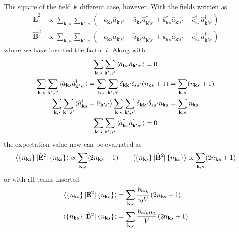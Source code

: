 \documentclass[../../../main.tex]{subfiles}
\begin{document}
The square of the field is different case, however.
With the fields written as
\begin{align*}
  \hat{\mathbf{E}}^2 & \propto \sum_{\mathbf{k},s}\sum_{\mathbf{k}',s'} \left( -\hat{a}_{\mathbf{k }s}\hat{a}_{\mathbf{k }'s'} +\hat{a}_{\mathbf{k }s} \hat{a}^\dagger_{\mathbf{k }'s'} +\hat{a}^\dagger_{\mathbf{k }s} \hat{a}_{\mathbf{k }'s'}  -\hat{a}^\dagger_{\mathbf{k }s} \hat{a}^\dagger_{\mathbf{k }'s'}  \right) \\
  \hat{\mathbf{B}}^2 & \propto \sum_{\mathbf{k},s}\sum_{\mathbf{k}',s'} \left( -\hat{a}_{\mathbf{k }s}\hat{a}_{\mathbf{k }'s'} +\hat{a}_{\mathbf{k }s} \hat{a}^\dagger_{\mathbf{k }'s'} +\hat{a}^\dagger_{\mathbf{k }s} \hat{a}_{\mathbf{k }'s'}  -\hat{a}^\dagger_{\mathbf{k }s} \hat{a}^\dagger_{\mathbf{k }'s'}  \right)
\end{align*}
where we have inserted the factor $i$.
Along with
\begin{gather*}
  \sum_{\mathbf{k},s}\sum_{\mathbf{k}',s'} \braket{\hat{a}_{\mathbf{k }s}   \hat{a}_{\mathbf{k }'s'} }=0                        \\
  \sum_{\mathbf{k},s}\sum_{\mathbf{k}',s'} \braket{\hat{a}_{\mathbf{k }s}   \hat{a}^\dagger_{\mathbf{k }'s'} }=\sum_{\mathbf{k},s}\sum_{\mathbf{k}',s'} \delta_{\mathbf{k}\mathbf{k'}}\delta_{ss'}(n_{\mathbf{k }s}+1)= \sum_{\mathbf{k},s}(n_{\mathbf{k }s}+1) \\
  \sum_{\mathbf{k},s}\sum_{\mathbf{k}',s'} \braket{\hat{a}^\dagger_{\mathbf{k }s}=   \hat{a}_{\mathbf{k }'s'} } \sum_{\mathbf{k},s}\sum_{\mathbf{k}',s'} \delta_{\mathbf{k}\mathbf{k'}}\delta_{ss'}n_{\mathbf{k }s}=\sum_{\mathbf{k},s} n_{\mathbf{k }s} \\
  \sum_{\mathbf{k},s}\sum_{\mathbf{k}',s'} \braket{\hat{a}^\dagger_{\mathbf{k }s}   \hat{a}^\dagger_{\mathbf{k }'s'} }=0
\end{gather*}
the expectation value now can be evaluated as
\begin{equation*}
  \braket{\left\{ n_{\mathbf{k }s} \right\}  | \hat{\mathbf{E }}^2|\left\{ n_{\mathbf{k }s} \right\} }\propto \sum_{\mathbf{k},s}(2 n_{\mathbf{k }s}+1)
  \qquad
  \braket{\left\{ n_{\mathbf{k }s} \right\}  | \hat{\mathbf{B }}^2|\left\{ n_{\mathbf{k }s} \right\} }\propto \sum_{\mathbf{k},s} (2 n_{\mathbf{k }s}+1)
\end{equation*}
or with all terms inserted
\begin{align*}
  \braket{\left\{ n_{\mathbf{k }s} \right\}  | \hat{\mathbf{E }}^2|\left\{ n_{\mathbf{k }s} \right\} } & =  \sum_{\mathbf{k},s} \frac{\hbar \omega_k }{\epsilon_0 V}\left( 2n_{\mathbf{k }s}+1\right)
  \\
  \braket{\left\{ n_{\mathbf{k }s} \right\}  | \hat{\mathbf{B }}^2|\left\{ n_{\mathbf{k }s} \right\} } & =  \sum_{\mathbf{k},s} \frac{\hbar \omega_k \mu_0}{V}\left( 2n_{\mathbf{k }s}+1 \right)
\end{align*}
\end{document}
